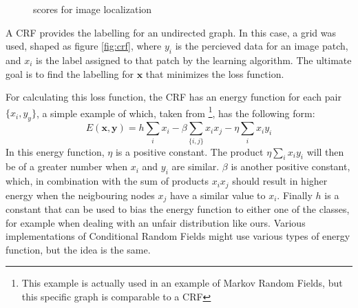\begin{figure}
\begin{floatrow}
	{
		\caption{scores for image localization}
		\label{tab:imagelocresults}
	}
\end{floatrow}
\end{figure}
A CRF provides the labelling for an undirected graph. In this case, a grid was
used, shaped as figure \ref{fig:crf}, where $y_i$ is the percieved data for an
image patch, and $x_i$ is the label assigned to that patch by the learning
algorithm. The ultimate goal is to find the labelling for $\mathbf{x}$ that
minimizes the loss function. 

For calculating this loss function, the CRF has an energy function for each pair
$\{x_i, y_y\}$, a simple
example of which, taken from \cite{bishop2006pattern}\footnote{This example is actually
used in an example of Markov Random Fields, but this specific graph is
comparable to a CRF},  has the following form: 
\begin{equation}
E(\mathbf{x}, \mathbf{y}) = h\sum_i x_i - \beta \sum_{\{i, j\}} x_i x_j
- \eta \sum_i x_i y_i
\end{equation}
In this energy function, $\eta$ is a positive constant. The product $\eta \sum_i
x_i y_i$ will then be of a greater number when $x_i$ and $y_i$ are similar.
$\beta$ is another positive constant, which, in combination with the sum of
products $x_i x_j$ should result in higher energy when the neigbouring nodes
$x_j$ have a similar value to $x_i$. Finally $h$ is a constant that can be used
to bias the energy function to either one of the classes, for example when
dealing with an unfair distribution like ours. Various implementations of
Conditional Random Fields might use various types of energy function, but the
idea is the same.

